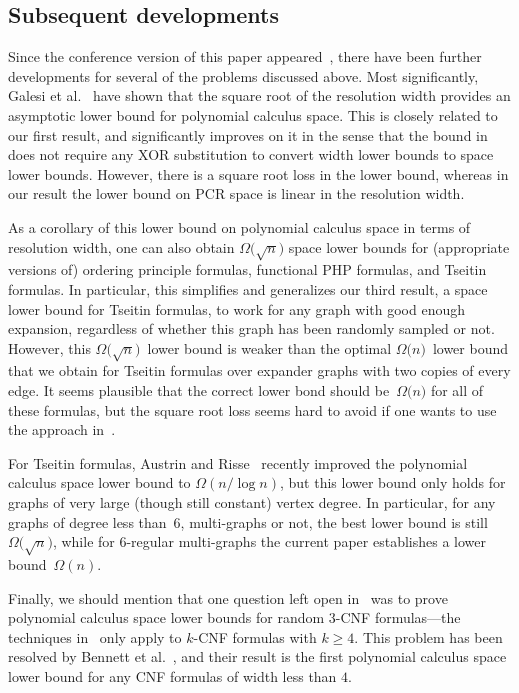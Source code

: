 \documentclass[11pt]{article}
\makeatletter
\numberwithin{equation}{section}
\theoremstyle{definition}
\theoremstyle{plain}
\theoremstyle{plain}
\theoremstyle{definition}
\newcommand{\Bigomega}[1]{\Omega \bigl( #1 \bigr)}
\newcommand{\bigomega}[1]{\Omega ( #1 )}
\newcommand{\etal}{et al.\@\xspace}
\newcommand{\mysubsection}[1]{\subsection{#1}}
\makeatother
\begin{document}
\mysubsection{Subsequent developments}

Since the conference version of this paper 
appeared~\cite{conf-version}, %
there have been further developments for several of the problems
discussed above. 
%
Most significantly,
Galesi \etal~\cite{GKT19SpaceWidth} have shown that
the square root of the resolution width provides an asymptotic lower
bound for polynomial calculus space.
This is closely related to our first result, and significantly
improves on it in the sense that the bound in~\cite{GKT19SpaceWidth}
does not require any XOR substitution to convert width lower bounds to
space lower bounds. However, there is a square root loss in the lower
bound, whereas in our result the lower bound on PCR space is linear in
the resolution width.

As a corollary of this lower bound on polynomial calculus space in
terms of resolution width, one can also obtain
$\Bigomega{\sqrt{n}}$
space lower bounds for (appropriate versions of)
ordering principle formulas, 
functional PHP formulas, 
and
Tseitin formulas.
%
In particular, this simplifies and generalizes our third result, a
space lower bound for Tseitin formulas, to work for any graph with
good enough expansion, regardless of whether this graph has been
randomly sampled or not.
%
However, this
$\Bigomega{\sqrt{n}}$~lower bound is weaker than the optimal 
$\Bigomega{n}$~lower bound that we obtain for Tseitin formulas over
expander graphs with two copies of every edge. It seems plausible that 
the correct lower bond should be~$\Bigomega{n}$
for all of these formulas, but the square root loss seems hard to
avoid if one wants to use the approach in~\cite{GKT19SpaceWidth}.

For Tseitin formulas, Austrin and Risse~\cite{AR22PerfectMatching}
recently improved the polynomial calculus space lower bound to
$\bigomega{n/\log n}$,
but this lower bound only holds for graphs of very large (though
still constant) vertex degree. In particular, for any graphs of degree less
than~$6$, multi-graphs or not, the best lower bound is 
still~$\Bigomega{\sqrt{n}}$,
while for $6$-regular multi-graphs the current paper establishes  a
lower bound~$\bigomega{n}$.

Finally, we should mention that one question left open
in~\cite{BG15Framework} was to prove polynomial calculus space lower
bounds for random \mbox{$3$-CNF} formulas---the techniques 
in~\cite{BG15Framework} only apply %
to  %
\mbox{$k$-CNF} formulas with 
$k \geq 4$. This problem has been resolved by
Bennett \etal~\cite{BBGHMW17SpaceProofCplx},
and their result is the first polynomial calculus space lower bound for
any CNF formulas of width less than $4$.
\end{document}
